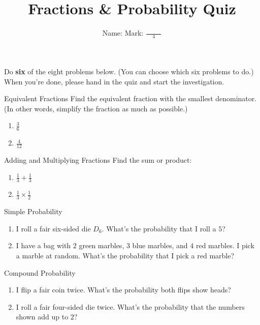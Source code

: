 \documentclass[12pt,letterpaper]{article}
\title{Fractions \& Probability Quiz}
\author{Name: \underline{\hspace{5cm}} Mark: $\displaystyle \frac{\hspace{3em}}{4}$}
\begin{document}
\maketitle

\thispagestyle{empty}

Do \textbf{six} of the eight problems below. (You can choose which six problems
to do.) When you're done, please hand in the quiz and start the investigation.

\begin{problem}{Equivalent Fractions}
 Find the equivalent fraction with the smallest denominator. (In other words,
 simplify the fraction as much as possible.)

 \begin{enumerate}[\hspace{.5cm}a.]
  \item $\frac{3}{6}$
  \item $\frac{4}{12}$
 \end{enumerate}
\end{problem}

\begin{problem}{Adding and Multiplying Fractions}
Find the sum or product:

\begin{enumerate}[\hspace{.5cm}a.]
\item $\frac{1}{3} + \frac{1}{3}$
\item $\frac{1}{3} \times \frac{1}{2}$
\end{enumerate}
\end{problem}

\begin{problem}{Simple Probability}
\begin{enumerate}[\hspace{.5cm}a.]
\item I roll a fair six-sided die $D_6$. What's the probability that I roll a
$5$?
\item I have a bag with $2$ green marbles, $3$ blue marbles, and $4$ red
marbles. I pick a marble at random. What's the probability that I pick a red
marble?
\end{enumerate}
\end{problem}

\begin{problem}{Compound Probability}
\begin{enumerate}[\hspace{.5cm}a.]
\item I flip a fair coin twice. What's the probability both flips show heads?
\item I roll a fair four-sided die twice. What's the probability that the
numbers shown add up to $2$?
\end{enumerate}
\end{problem}
\end{document}
